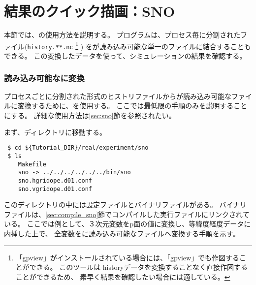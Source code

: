 \section{結果のクイック描画：SNO} \label{sec:quicklook}

本節では、\sno の使用方法を説明する。
プログラム\sno は、プロセス毎に分割された{\netcdf}ファイル(\verb|history.**.nc|
\footnote{「gpview」がインストールされている場合には、「gpview」でも作図することができる。
このツールは historyデータを変換することなく直接作図することができるため、
素早く結果を確認したい場合には適している。
}
)
を{\grads}が読み込み可能な単一の{\netcdf}ファイルに結合することもできる。
この変換した{\netcdf}データを使って、シミュレーションの結果を確認する。


\subsubsection{{\grads}読み込み可能な{\netcdf}に変換}
プロセスごとに分割された{\netcdf}形式のヒストリファイルから{\grads}が読み込み可能な{\netcdf}ファイルに変換するために、\sno を使用する。
ここでは最低限の手順のみを説明することにする。
詳細な使用方法は\ref{sec:sno}節を参照されたい。

まず、\sno ディレクトリに移動する。
\begin{verbatim}
 $ cd ${Tutorial_DIR}/real/experiment/sno
 $ ls
    Makefile
    sno -> ../../../../../../bin/sno
    sno.hgridope.d01.conf
    sno.vgridope.d01.conf
\end{verbatim}
このディレクトリの中には設定ファイルとバイナリファイルがある。
バイナリファイルは、\ref{sec:compile_sno}節でコンパイルした実行ファイルにリンクされている。
ここでは例として、３次元変数をp面の値に変換し、等緯度経度データに内挿した上で、
全変数を{\grads}に読み込み可能な{\netcdf}ファイルへ変換する手順を示す。


